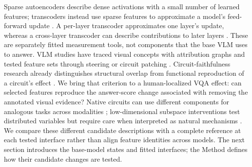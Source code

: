 Sparse autoencoders describe dense activations with a small number of learned features; transcoders instead use sparse features to approximate a model's feed-forward update \citep{cunningham2024sparseAutoencoders,dunefsky2024transcoders}. A per-layer transcoder approximates one layer's update, whereas a cross-layer transcoder can describe contributions to later layers \citep{dunefsky2024transcoders,ameisen2025circuittracing}. These are separately fitted measurement tools, not components that the base VLM uses to answer. VLM studies have traced visual concepts with attribution graphs and tested feature sets through steering or circuit patching \citep{yang2026vlmcircuittracing,zhou2026sparsevisual}. Circuit-faithfulness research already distinguishes structural overlap from functional reproduction of a circuit's effect \citep{hanna2024faithfulness}. We bring that criterion to a human-localized VQA effect: can selected features reproduce the answer-score change associated with removing the annotated visual evidence? Native circuits can use different components for analogous tasks across modalities \citep{sameTaskDifferentCircuits}; low-dimensional subspace interventions test distributed variables but require care when interpreted as natural mechanisms \citep{geiger2024das,makelov2024subspace}. We compare these different candidate descriptions with a complete reference at each tested interface rather than align feature identities across models. The next section introduces the base-model states and fitted interfaces; the Method defines how their candidate changes are tested.
